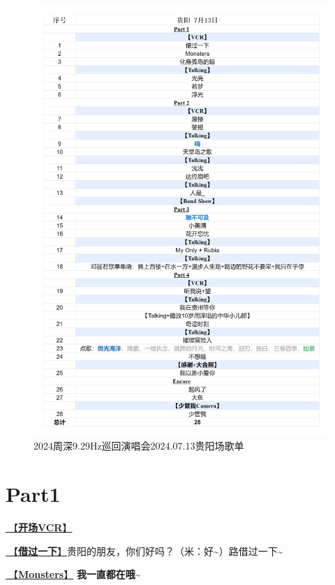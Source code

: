 \documentclass[]{ctexbook}
\begin{document}
\begin{figure}

{\centering \includegraphics[width=330pt]{img/playlists/playlists-guiyang-20240713} 

}

\caption{2024周深9.29Hz巡回演唱会2024.07.13贵阳场歌单}\label{fig:unnamed-chunk-50}
\end{figure}

\newpage

\section{Part1}\label{guiyang-20240713-part1}

\hyperref[opening-vcr]{🎥【\textbf{开场VCR}】}

\hyperref[I-will-go-my-way]{🎵【\textbf{借过一下}】}贵阳的朋友，你们好吗？（米：好\textasciitilde）路借过一下\textasciitilde{}

\hyperref[Monsters]{🎵【\textbf{Monsters}】} \textbf{我一直都在哦\textasciitilde{}}
\end{document}

